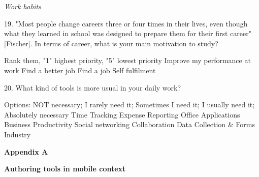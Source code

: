 \begin{small}
\textit{Work habits}

19. "Most people change careers three or four times in their lives, even though what they learned in school was designed to prepare them for their first career" [Fischer]. In terms of career, what is your main motivation to study? 

Rank them, "1" highest priority, "5" lowest priority
\hfill \break {}  Improve my performance at work
\hfill \break {}  Find a better job
\hfill \break {}  Find a job
\hfill \break {}  Self fulfilment


20. What kind of tools is more usual in your daily work? 

Options: NOT necessary; I rarely need it; Sometimes I need it; I usually need it; Absolutely necessary
\hfill \break {}  Time Tracking					
\hfill \break {}  Expense Reporting					
\hfill \break {}  Office Applications					
\hfill \break {}  Business					
\hfill \break {}  Productivity					
\hfill \break {}  Social networking					
\hfill \break {}  Collaboration					
\hfill \break {}  Data Collection \& Forms					
\hfill \break {}  Industry					



\end{small}



\clearpage{\pagestyle{empty}\cleardoublepage}

\begin{Large}
\textbf{Appendix A} 
\end{Large}
\vspace{3em}

\textbf{Authoring tools in mobile context}

